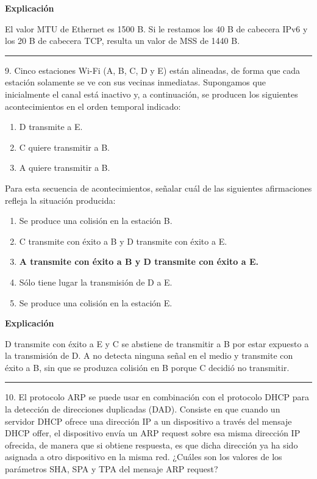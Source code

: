 \documentclass[10pt,a4paper]{article}
\begin{document}
\textbf{Explicación}

El valor MTU de Ethernet es 1500 B. Si le restamos los 40 B de cabecera IPv6 y los 20 B de cabecera TCP, resulta un valor de MSS de 1440 B.

\vspace{15pt} \hrule \vspace{15pt}




9.  Cinco estaciones Wi-Fi (A, B, C, D y E) están alineadas, de forma que cada estación solamente se ve con sus vecinas inmediatas. Supongamos que inicialmente el canal está inactivo y, a continuación, se producen los siguientes acontecimientos en el orden temporal indicado:

\begin{enumerate}
    \item D transmite a E.
    \item C quiere transmitir a B.
    \item A quiere transmitir a B.
\end{enumerate}

Para esta secuencia de acontecimientos, señalar cuál de las siguientes afirmaciones refleja la situación producida:

\begin{enumerate}[label=\alph*]
    \item Se produce una colisión en la estación B.
    \item C transmite con éxito a B y D transmite con éxito a E.
    \item \textbf{A transmite con éxito a B y D transmite con éxito a E.}
    \item Sólo tiene lugar la transmisión de D a E.
    \item Se produce una colisión en la estación E.
\end{enumerate}

\textbf{Explicación}

D transmite con éxito a E y C se abstiene de transmitir a B por estar expuesto a la transmisión de D. A no detecta ninguna señal en el medio y transmite con éxito a B, sin que se produzca colisión en B porque C decidió no transmitir.

\vspace{15pt} \hrule \vspace{15pt}




10.  El protocolo ARP se puede usar en combinación con el protocolo DHCP para la detección de direcciones duplicadas (DAD). Consiste en que cuando un servidor DHCP ofrece una dirección IP a un dispositivo a través del mensaje DHCP offer, el dispositivo envía un ARP request sobre esa misma dirección IP ofrecida, de manera que si obtiene respuesta, es que dicha dirección ya ha sido asignada a otro dispositivo en la misma red. ¿Cuáles son los valores de los parámetros SHA, SPA y TPA del mensaje ARP request?
\end{document}
